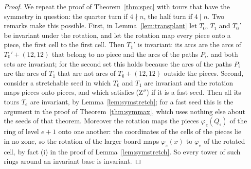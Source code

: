 \documentclass[11pt]{amsart}
\theoremstyle{remark}
\begin{document}
\begin{proof}
We repeat the proof of Theorem~\ref{thm:spec} with tours that have the symmetry in question: the quarter turn if
$4\nmid n$, the half turn if $4\mid n$. Two remarks make this possible. First, in Lemma~\ref{lem:transplant} let
$T_0$, $T_1$ and $T_0'$ be invariant under the rotation, and let the rotation map every piece onto a piece, the first
cell to the first cell. Then $T_1'$ is invariant: its arcs are the arcs of $T_0'+(12,12)$ that belong to no piece
and the arcs of the paths $P_i$, and both sets are invariant; for the second set this holds because the arcs of the
paths $P_i$ are the arcs of $T_1$ that are not arcs of $T_0+(12,12)$ outside the pieces. Second, consider a
stretchable seed in which $T_0$ and $T_1$ are invariant and the rotation maps pieces onto pieces, and which
satisfies (Z$''$) if it is a fast seed. Then all its tours $T_e$ are invariant, by Lemma~\ref{lem:symstretch}; for
a fast seed this is the argument in the proof of Theorem~\ref{thm:symmax}, which uses nothing else about the seeds
of that theorem. Moreover the rotation maps the pieces $\varphi_e(Q_i)$ of the ring of level $e+1$ onto one
another: the coordinates of the cells of the pieces lie in no zone, so the rotation of the larger board maps
$\varphi_e(x)$ to $\varphi_e$ of the rotated cell, by fact (i) in the proof of Lemma~\ref{lem:symstretch}. So every
tower of such rings around an invariant base is invariant.


\end{proof}
\end{document}

